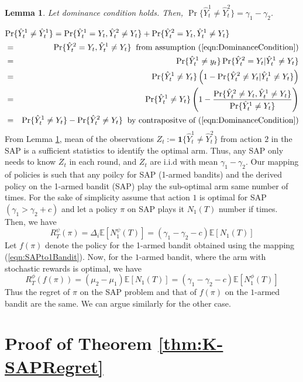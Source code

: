 \documentclass{article}
\newtheorem{lemma}{Lemma}
\begin{document}
\begin{lemma}
	\label{lma:SuffStat2Action}
	Let  dominance condition holds. Then, $\Pr\{\hat{Y}^1_t \neq \hat{Y}^2_t\}=\gamma_1-\gamma_2$.
\end{lemma}
\begin{eqnarray}
\lefteqn{\Pr\{\hat{Y}^1_t \neq \hat{Y}^1_t\}=\Pr\{\hat{Y}^1_t=Y_t, \hat{Y}^2_t \neq Y_t\} + \Pr\{\hat{Y}^2_t=Y_t, \hat{Y}^1_t \neq Y_t\}} \\
&=& \Pr\{\hat{Y}^2_t=Y_t, \hat{Y}^1_t \neq Y_t\} \;\;\mbox{from assumption (\ref{eqn:DominanceCondition})}\\
&=& \Pr\{\hat{Y}^1_t\neq y_t\}\Pr\{\hat{Y}^2_t= Y_t| \hat{Y}^1_t\neq Y_t\} \\
&=& \Pr\{\hat{Y}^1_t\neq Y_t\}\left( 1-\Pr\{\hat{Y}^2_t \neq  Y_t| \hat{Y}^1_t\neq Y_t\} \right ) \\
&=& \Pr\{\hat{Y}^1_t\neq Y_t\}\left( 1-\frac{\Pr\{\hat{Y}^2_t \neq  Y_t, \hat{Y}^1_t\neq Y_t\}}{\Pr\{\hat{Y}^1_t\neq Y_t\}} \right )\\
&=& \Pr\{\hat{Y}^1_t\neq Y_t\}-\Pr\{\hat{Y}^2_t \neq  Y_t\}  \;\; \mbox{by contrapositve of  (\ref{eqn:DominanceCondition})} 
\end{eqnarray}
From Lemma \ref{lma:SuffStat2Action}, mean of the observations $Z_t:=\boldsymbol{1}{\{\hat{Y}_t^1 \neq \hat{Y}_t^2 \}}$ from action $2$ in the SAP is a sufficient statistics to identify the optimal arm. Thus, any SAP only needs to know $Z_t$ in each round, and $Z_t$ are i.i.d with mean $\gamma_1-\gamma_2$.  Our mapping of policies is such that any poilcy for SAP (1-armed bandits) and the derived policy on the 1-armed bandit (SAP) play the sub-optimal arm same number of times.  For the sake of simplicity assume that action $1$ is optimal for SAP  $(\gamma_1> \gamma_2 + c)$ and let a policy $\pi$ on SAP plays it $N_1(T)$ number if times. Then, we have
\[ R^\psi_T(\pi)=\Delta_i\mathbb{E}[N^\psi_1(T)]=(\gamma_1-\gamma_2-c)\mathbb{E}[N_1(T)]\]
Let $f(\pi)$ denote the policy for the 1-armed bandit obtained using the mapping (\ref{eqn:SAPto1Bandit}). Now, for the $1$-armed bandit, where the arm with stochastic rewards is optimal, we have
\[ R^\phi_T(f(\pi))=(\mu_2-\mu_1)\mathbb{E}[N_1(T)]=(\gamma_1-\gamma_2-c)\mathbb{E}[N^\phi_1(T)]\]
Thus the regret of $\pi$ on the SAP problem and that of $f(\pi)$ on the $1$-armed bandit are the same. We can argue similarly for the other case. 


\section{Proof of Theorem \ref{thm:K-SAPRegret}}
\end{document}
